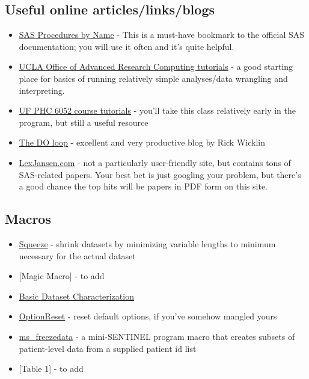 \documentclass[
  letterpaper,
  DIV=11,
  numbers=noendperiod]{scrreprt}
\begin{document}
\hypertarget{useful-online-articleslinksblogs}{%
\subsection{Useful online
articles/links/blogs}\label{useful-online-articleslinksblogs}}

\begin{itemize}
\item
  \href{https://documentation.sas.com/doc/en/pgmsascdc/9.4_3.5/allprodsproc/procedures.htm}{SAS
  Procedures by Name} - This is a must-have bookmark to the official SAS
  documentation; you will use it often and it's quite helpful.
\item
  \href{https://stats.oarc.ucla.edu/sas/}{UCLA Office of Advanced
  Research Computing tutorials} - a good starting place for basics of
  running relatively simple analyses/data wrangling and interpreting.
\item
  \href{https://bolt.mph.ufl.edu/software/sas/phc-6052-sas-tutorials/}{UF
  PHC 6052 course tutorials} - you'll take this class relatively early
  in the program, but still a useful resource
\item
  \href{https://blogs.sas.com/content/iml/}{The DO loop} - excellent and
  very productive blog by Rick Wicklin
\item
  \href{https://www.lexjansen.com/}{LexJansen.com} - not a particularly
  user-friendly site, but contains tons of SAS-related papers. Your best
  bet is just googling your problem, but there's a good chance the top
  hits will be papers in PDF form on this site.
\end{itemize}

\hypertarget{macros}{%
\subsection{Macros}\label{macros}}

\begin{itemize}
\item
  \href{local_resources/squeeze.sas}{Squeeze} - shrink datasets by
  minimizing variable lengths to minimum necessary for the actual
  dataset
\item
  {[}Magic Macro{]} - to add
\item
  \href{local_resources/dataset_characterization.sas}{Basic Dataset
  Characterization}
\item
  \href{local_resources/OptionReset.sas}{OptionReset} - reset default
  options, if you've somehow mangled yours
\item
  \href{local_resources/ms_freezedata.sas}{ms\_freezedata} - a
  mini-SENTINEL program macro that creates subsets of patient-level data
  from a supplied patient id list
\item
  {[}Table 1{]} - to add
\end{itemize}
\end{document}
